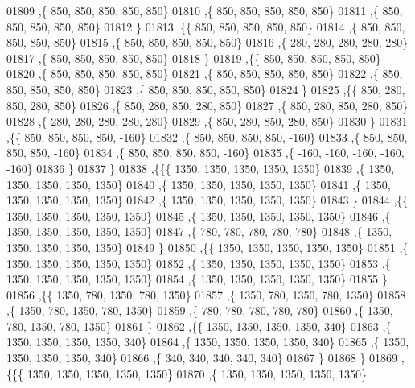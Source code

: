 \begin{DoxyCode}
01809    ,\{   850,   850,   850,   850,   850\}
01810    ,\{   850,   850,   850,   850,   850\}
01811    ,\{   850,   850,   850,   850,   850\}
01812    \}
01813   ,\{\{   850,   850,   850,   850,   850\}
01814    ,\{   850,   850,   850,   850,   850\}
01815    ,\{   850,   850,   850,   850,   850\}
01816    ,\{   280,   280,   280,   280,   280\}
01817    ,\{   850,   850,   850,   850,   850\}
01818    \}
01819   ,\{\{   850,   850,   850,   850,   850\}
01820    ,\{   850,   850,   850,   850,   850\}
01821    ,\{   850,   850,   850,   850,   850\}
01822    ,\{   850,   850,   850,   850,   850\}
01823    ,\{   850,   850,   850,   850,   850\}
01824    \}
01825   ,\{\{   850,   280,   850,   280,   850\}
01826    ,\{   850,   280,   850,   280,   850\}
01827    ,\{   850,   280,   850,   280,   850\}
01828    ,\{   280,   280,   280,   280,   280\}
01829    ,\{   850,   280,   850,   280,   850\}
01830    \}
01831   ,\{\{   850,   850,   850,   850,  -160\}
01832    ,\{   850,   850,   850,   850,  -160\}
01833    ,\{   850,   850,   850,   850,  -160\}
01834    ,\{   850,   850,   850,   850,  -160\}
01835    ,\{  -160,  -160,  -160,  -160,  -160\}
01836    \}
01837   \}
01838  ,\{\{\{  1350,  1350,  1350,  1350,  1350\}
01839    ,\{  1350,  1350,  1350,  1350,  1350\}
01840    ,\{  1350,  1350,  1350,  1350,  1350\}
01841    ,\{  1350,  1350,  1350,  1350,  1350\}
01842    ,\{  1350,  1350,  1350,  1350,  1350\}
01843    \}
01844   ,\{\{  1350,  1350,  1350,  1350,  1350\}
01845    ,\{  1350,  1350,  1350,  1350,  1350\}
01846    ,\{  1350,  1350,  1350,  1350,  1350\}
01847    ,\{   780,   780,   780,   780,   780\}
01848    ,\{  1350,  1350,  1350,  1350,  1350\}
01849    \}
01850   ,\{\{  1350,  1350,  1350,  1350,  1350\}
01851    ,\{  1350,  1350,  1350,  1350,  1350\}
01852    ,\{  1350,  1350,  1350,  1350,  1350\}
01853    ,\{  1350,  1350,  1350,  1350,  1350\}
01854    ,\{  1350,  1350,  1350,  1350,  1350\}
01855    \}
01856   ,\{\{  1350,   780,  1350,   780,  1350\}
01857    ,\{  1350,   780,  1350,   780,  1350\}
01858    ,\{  1350,   780,  1350,   780,  1350\}
01859    ,\{   780,   780,   780,   780,   780\}
01860    ,\{  1350,   780,  1350,   780,  1350\}
01861    \}
01862   ,\{\{  1350,  1350,  1350,  1350,   340\}
01863    ,\{  1350,  1350,  1350,  1350,   340\}
01864    ,\{  1350,  1350,  1350,  1350,   340\}
01865    ,\{  1350,  1350,  1350,  1350,   340\}
01866    ,\{   340,   340,   340,   340,   340\}
01867    \}
01868   \}
01869  ,\{\{\{  1350,  1350,  1350,  1350,  1350\}
01870    ,\{  1350,  1350,  1350,  1350,  1350\}

\end{DoxyCode}
